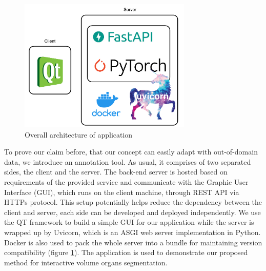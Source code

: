 \begin{figure}[!h]
    \centering
    \includegraphics[height=2.5in]{content/resources/new_images/application/arch.pdf}
    \caption{Overall architecture of application}
    \label{fig:arch_app}
\end{figure}



To prove our claim before, that our concept can easily adapt with out-of-domain data, we introduce an annotation tool. As usual, it comprises of two separated sides, the client and the server. The back-end server is hosted based on requirements of the provided service and communicate with the  Graphic User Interface (GUI), which runs on the client machine, through REST API via HTTPs protocol. This setup potentially helps reduce the dependency between the client and server, each side can be developed and deployed independently. We use the QT framework to build a simple GUI for our application while the server is wrapped up by Uvicorn, which is an ASGI web server implementation in Python. Docker is also used to pack the whole server into a bundle for maintaining version compatibility (figure \ref{fig:arch_app}). The application is used to demonstrate our proposed method for interactive volume organs segmentation. 
